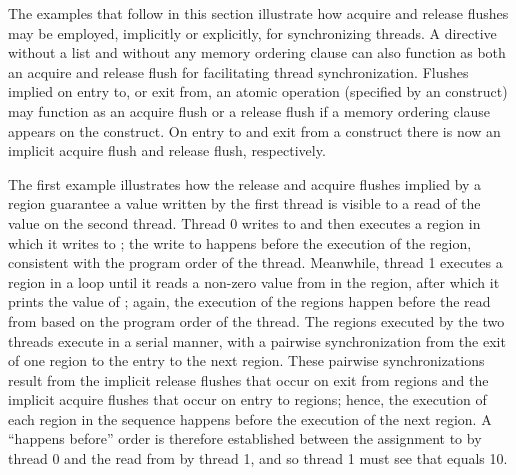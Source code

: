 The examples that follow in this section illustrate how acquire and release
flushes may be employed, implicitly or explicitly, for synchronizing threads. A
 directive without a list and without any memory ordering clause
can also function as both an acquire and release flush for facilitating thread
synchronization.  Flushes implied on entry to, or exit from, an atomic
operation (specified by an  construct) may function as an acquire
flush or a release flush if a memory ordering clause appears on the construct.
On entry to and exit from a  construct there is now an implicit
acquire flush and release flush, respectively.


The first example illustrates how the release and acquire flushes implied by a
 region guarantee a value written by the first thread is visible
to a read of the value on the second thread. Thread 0 writes to  and
then executes a  region in which it writes to ; the write
to  happens before the execution of the  region,
consistent with the program order of the thread.  Meanwhile, thread 1 executes a
 region in a loop until it reads a non-zero value from
 in the  region, after which it prints the value of
; again, the execution of the  regions happen before the
read from  based on the program order of the thread. The 
regions executed by the two threads execute in a serial manner, with a
pairwise synchronization from the exit of one  region to the
entry to the next  region.  These pairwise synchronizations
result from the implicit release flushes that occur on exit from
 regions and the implicit acquire flushes that occur on entry to
 regions; hence, the execution of each  region in
the sequence happens before the execution of the next  region.
A ``happens before'' order is therefore established between the assignment to 
by thread 0 and the read from  by thread 1, and so thread 1 must see that
 equals 10.

\pagebreak
{}

